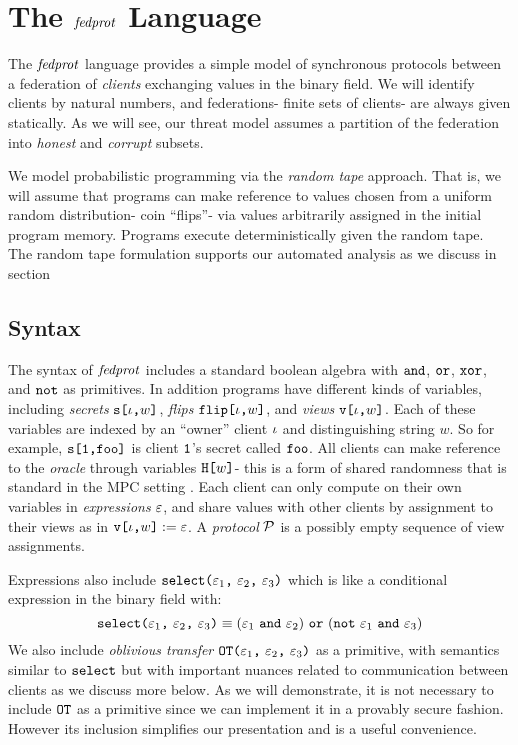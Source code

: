 \section{The $\mathit{fedprot}$ Language}

The $\mathit{fedprot}$ language provides a simple model of synchronous
protocols between a federation of \emph{clients} exchanging values in
the binary field. We will identify clients by natural numbers, and
federations- finite sets of clients- are always given statically.
As we will see, our threat model assumes a partition of the federation
into \emph{honest} and \emph{corrupt} subsets.

We model probabilistic programming via the \emph{random tape}
approach. That is, we will assume that programs can make reference to
values chosen from a uniform random distribution- coin ``flips''- via
values arbitrarily assigned in the initial program memory.  Programs
execute deterministically given the random tape. The random tape
formulation supports our automated analysis as we discuss in
section 

\subsection{Syntax} The syntax of $\mathit{fedprot}$ includes a standard
boolean algebra with $\texttt{and}$, $\texttt{or}$, $\texttt{xor}$, and $\texttt{not}$ as
primitives. In addition programs have different kinds of variables,
including \emph{secrets} $\texttt{s[}\iota\texttt{,}w\texttt{]}$, \emph{flips}
$\texttt{flip[}\iota\texttt{,}w\texttt{]}$, and \emph{views} $\texttt{v[}\iota\texttt{,}w\texttt{]}$.  Each of these
variables are indexed by an ``owner'' client $\iota$ and distinguishing
string $w$. So for example, $\texttt{s[}\texttt{1}\texttt{,}\texttt{foo}\texttt{]}$ is client
$\texttt{1}$'s secret called $\texttt{foo}$. All clients can make reference
to the \emph{oracle} through variables $\texttt{H[}w\texttt{]}$- this is a form
of shared randomness that is standard in the MPC setting \cite{XXX}.
Each client can only compute on their own variables in
\emph{expressions} $\varepsilon$, and share values with other clients by
assignment to their views as in $\texttt{v[}\iota\texttt{,}w\texttt{]} := \varepsilon$.  A
\emph{protocol} $\mathcal{P}$ is a possibly empty sequence of view
assignments.

Expressions also include $\texttt{select(} \varepsilon_1 \texttt{,}\ \varepsilon_2 \texttt{,}\ \varepsilon_3 \texttt{)}$ which is
like a conditional expression in the binary field with:
$$
\select{\be_1}{\be_2}{\be_3} \equiv (\be_1\ \eand\ \be_2)\ \eor\ (\enot\ \be_1\ \eand\ \be_3)
$$
We also include \emph{oblivious transfer} $\texttt{OT(} \varepsilon_1 \texttt{,}\ \varepsilon_2 \texttt{,}\ \varepsilon_3 \texttt{)}$ as a primitive,
with semantics similar to $\texttt{select}$ but with important nuances
related to communication between clients as we discuss more below.
As we will demonstrate, it is not necessary to include $\texttt{OT}$
as a primitive since we can implement it in a provably secure
fashion. However its inclusion simplifies our presentation and is a useful
convenience.

